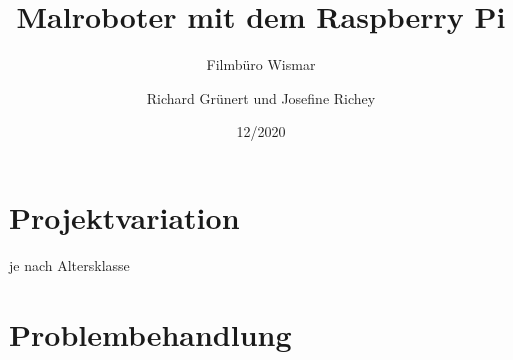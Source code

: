 \documentclass[12pt]{article}
\title{Malroboter mit dem Raspberry Pi}
\subtitle{Filmbüro Wismar}
\author{Richard Grünert und Josefine Richey}
\date{12/2020}
\begin{document}
\maketitle

\tableofcontents

\pagebreak





\section{Projektvariation}
je nach Altersklasse

\section{Problembehandlung}
\end{document}
